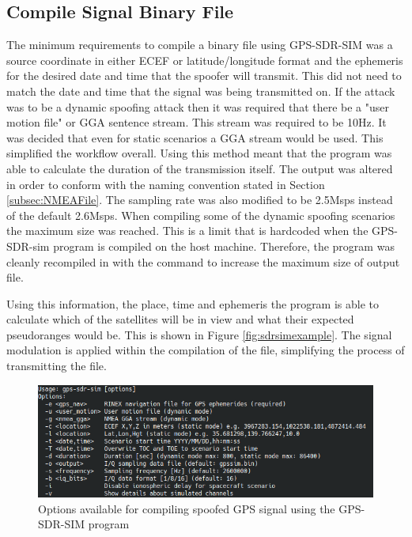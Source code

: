 \subsection{Compile Signal Binary File}
The minimum requirements to compile a binary file using GPS-SDR-SIM was a source coordinate in either ECEF or latitude/longitude format and the ephemeris for the desired date and time that the spoofer
will transmit. This did not need to match the date and time that the signal was being transmitted on. If the attack was to be a dynamic spoofing attack then it was
required that there be a "user motion file" or GGA sentence stream. This stream was required to be 10Hz. It was decided that even for static scenarios a GGA stream would
be used. This simplified the workflow overall. Using this method meant that the program was able to calculate the duration of the transmission itself. The output was
altered in order to conform with the naming convention stated in Section \ref{subsec:NMEAFile}. The sampling rate was also modified to be 2.5Msps instead of the default
2.6Msps.
When compiling some of the dynamic spoofing scenarios the maximum size was reached. This is a limit that is hardcoded when the GPS-SDR-sim program is compiled on the host
machine. Therefore, the program was cleanly recompiled in with the command to increase the maximum size of output file.

Using this information, the place, time and ephemeris the program is able to calculate which of the satellites will be in view and what their expected pseudoranges would
be. This is shown in Figure \ref{fig:sdrsimexample}.
The signal modulation is applied within the compilation of the file, simplifying the process of transmitting the file. 

\begin{figure}[!ht]
    \begin{centering}
        \includegraphics[width=14cm,keepaspectratio]{Figures/gps-sdr-sim options.png}
        \caption{Options available for compiling spoofed GPS signal using the GPS-SDR-SIM program}
    \label{fig:sdrsimoptions}
    \end{centering}
\end{figure}

